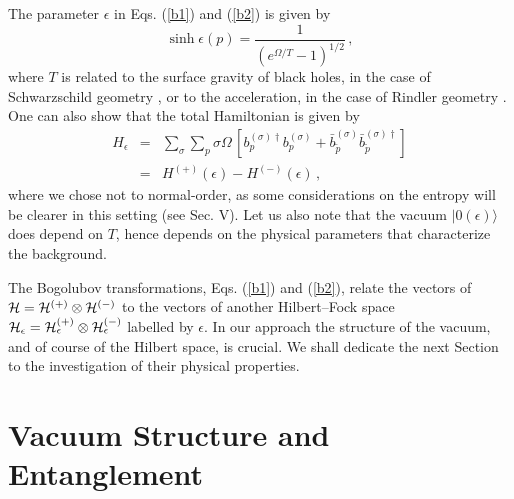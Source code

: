  The parameter $\epsilon$ in Eqs. (\ref{b1}) and
(\ref{b2}) is given by
\begin{equation}\label{boson-stat}
 \sinh \epsilon (p)= \frac{1}{(e^{\Omega/T}-1)^{1/2}}\,,
\end{equation}
where $T$ is related to the surface gravity of black holes, in the
case of Schwarzschild geometry \cite{HAW}, or to the acceleration,
in the case of Rindler geometry \cite{Unruh:db}. One can also show
that the total Hamiltonian is given by
\cite{birrell,HAW,Davies:1974th,Unruh:db,TAK,Iorio:2001te,umezawa}
\begin{eqnarray}
  H_{\epsilon} & = & \sum_{\sigma}\sum_p \sigma \Omega \,[ b_p^{(\sigma)
 \dagger} b_p^{(\sigma)} +
 \bar{b}_{\tilde{p}}^{(\sigma)}
 \bar{b}_{\tilde{p}}^{(\sigma)\dagger}] \nonumber \\
 &=& H^{(+)}(\epsilon) - H^{(-)}(\epsilon) \,{,}
 \label{hamrin}
 \end{eqnarray}
where we chose not to normal-order, as some considerations on the
entropy will be clearer in this setting (see Sec. V). Let us also
note that the vacuum $|0 (\epsilon) \rangle$ does depend on $T$,
hence depends on the physical parameters that characterize the
background.

 The Bogolubov transformations, Eqs. (\ref{b1}) and
(\ref{b2}), relate the vectors of ${\cal H} = {\cal H}^{(+)}
\otimes {\cal H}^{(-)}$ to the vectors of another Hilbert--Fock
space ${\cal H}_{\epsilon} = {\cal H}^{(+)}_{\epsilon} \otimes
{\cal H}^{(-)}_{\epsilon}$ labelled by $\epsilon$. In our approach
the structure of the vacuum, and of course of the Hilbert space,
is crucial. We shall dedicate the next Section to the
investigation of their physical properties.

\section{Vacuum Structure and Entanglement}
\setcounter{equation}{0}

